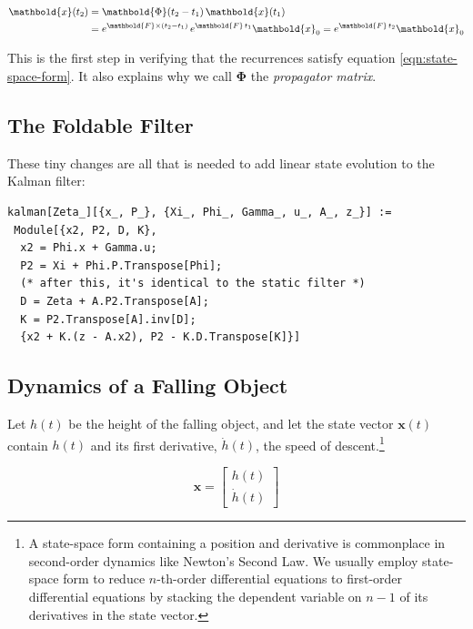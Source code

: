 \documentclass[10pt,oneside,x11names]{article}
\begin{document}
\begin{align}
\mathbold{x}(t_2)&=\mathbold{\Phi}(t_2-t_1)\,\mathbold{x}(t_1) \\
\notag
&=e^{\mathbold{F}\times(t_2-t_1)}\,e^{\mathbold{F}\,t_1}\mathbold{x}_0=e^{\mathbold{F}\,t_2}\mathbold{x}_0
\end{align}

\noindent This is the first step in verifying that the recurrences satisfy
equation \ref{eqn:state-space-form}. It also explains why we call
\(\mathbold{\Phi}\) the \emph{propagator matrix}.

\subsection{The Foldable Filter}
\label{sec:orgheadline5}

These tiny changes are all that is needed to add linear state evolution to the Kalman
filter:

\begin{verbatim}
kalman[Zeta_][{x_, P_}, {Xi_, Phi_, Gamma_, u_, A_, z_}] :=
 Module[{x2, P2, D, K},
  x2 = Phi.x + Gamma.u;
  P2 = Xi + Phi.P.Transpose[Phi];
  (* after this, it's identical to the static filter *)
  D = Zeta + A.P2.Transpose[A];
  K = P2.Transpose[A].inv[D];
  {x2 + K.(z - A.x2), P2 - K.D.Transpose[K]}]\end{verbatim}

\subsection{Dynamics of a Falling Object}
\label{sec:orgheadline6}

Let \(h(t)\) be the height of
the falling object, and let the state vector \(\mathbold{x}(t)\) contain \(h(t)\)
and its first derivative, \(\dot{h}(t)\), the speed of descent.\footnote{A state-space form containing a position and derivative is commonplace
in second-order dynamics like Newton's Second Law. We usually employ state-space
form to reduce \(n\)-th-order differential equations to first-order differential
equations by stacking the dependent variable on \(n-1\) of its derivatives in the
state vector.}

\begin{equation*}
\mathbold{x} = 
\begin{bmatrix} { h } (t) \\ \dot { h } (t) \end{bmatrix}
\end{equation*}
\end{document}
